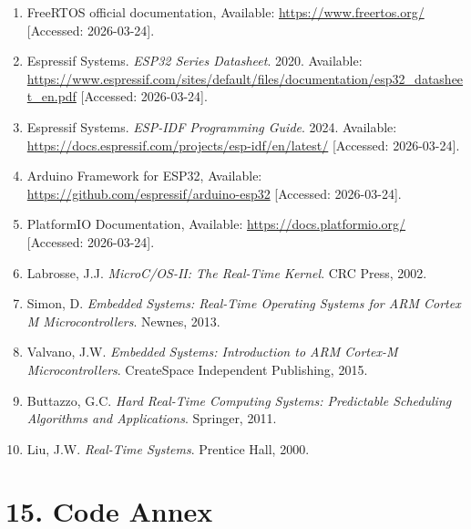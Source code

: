 \documentclass[12pt]{article}
\begin{document}
\begin{enumerate}
    \item FreeRTOS official documentation, Available: \url{https://www.freertos.org/} [Accessed: 2026-03-24].
    
    \item Espressif Systems. \textit{ESP32 Series Datasheet}. 2020. Available: \url{https://www.espressif.com/sites/default/files/documentation/esp32_datasheet_en.pdf} [Accessed: 2026-03-24].
    
    \item Espressif Systems. \textit{ESP-IDF Programming Guide}. 2024. Available: \url{https://docs.espressif.com/projects/esp-idf/en/latest/} [Accessed: 2026-03-24].
    
    \item Arduino Framework for ESP32, Available: \url{https://github.com/espressif/arduino-esp32} [Accessed: 2026-03-24].
    
    \item PlatformIO Documentation, Available: \url{https://docs.platformio.org/} [Accessed: 2026-03-24].
    
    \item Labrosse, J.J. \textit{MicroC/OS-II: The Real-Time Kernel}. CRC Press, 2002.
    
    \item Simon, D. \textit{Embedded Systems: Real-Time Operating Systems for ARM Cortex M Microcontrollers}. Newnes, 2013.
    
    \item Valvano, J.W. \textit{Embedded Systems: Introduction to ARM Cortex-M Microcontrollers}. CreateSpace Independent Publishing, 2015.
    
    \item Buttazzo, G.C. \textit{Hard Real-Time Computing Systems: Predictable Scheduling Algorithms and Applications}. Springer, 2011.
    
    \item Liu, J.W. \textit{Real-Time Systems}. Prentice Hall, 2000.
\end{enumerate}

\section*{15. Code Annex}
\end{document}
